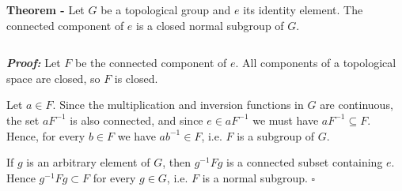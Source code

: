 \documentclass[12pt]{article}
\begin{document}
{\bf Theorem -} Let $G$ be a topological group and $e$ its identity element. The connected component of $e$ is a closed normal subgroup of $G$.

$\,$

{\bf \emph{Proof:}} Let $F$ be the connected component of $e$. All components of a topological space are closed, so $F$ is closed.

Let $a \in F$. Since the multiplication and inversion functions in $G$ are continuous, the set $a F^{-1}$ is also connected, and since $e \in aF^{-1}$ we must have $aF^{-1} \subseteq F$. Hence, for every $b \in F$ we have $ab^{-1} \in F$, i.e. $F$ is a subgroup of $G$.

If $g$ is an arbitrary element of $G$, then $g^{-1}Fg$ is a connected subset containing $e$. Hence $g^{-1}Fg \subset F$ for every $g \in G$, i.e. $F$ is a normal subgroup. $\square$
\end{document}
